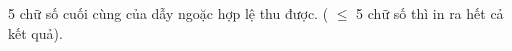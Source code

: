 5 chữ số cuối cùng của dẫy ngoặc hợp lệ thu được. ( $\le$  5 chữ số thì in ra hết cả kết quả).

\